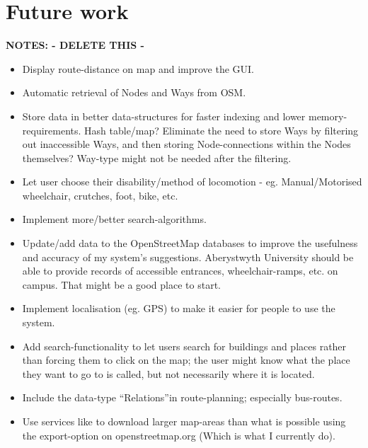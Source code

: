 \section{Future work}
\textbf{NOTES: - DELETE THIS -}
\begin{itemize}
	\item Display route-distance on map and improve the GUI.
	\item Automatic retrieval of Nodes and Ways from OSM.%
	\item Store data in better data-structures for faster indexing and lower memory-requirements.
	\subitem Hash table/map?
	\subitem Eliminate the need to store Ways by filtering out inaccessible Ways, and then storing Node-connections within the Nodes themselves? Way-type might not be needed after the filtering.
	\item Let user choose their disability/method of locomotion - eg. Manual/Motorised wheelchair, crutches, foot, bike, etc.
	\item Implement more/better search-algorithms.
	\item Update/add data to the OpenStreetMap databases to improve the usefulness and accuracy of my system's suggestions.
	\subitem Aberystwyth University should be able to provide records of accessible entrances, wheelchair-ramps, etc. on campus. That might be a good place to start.
	\item Implement localisation (eg. GPS) to make it easier for people to use the system.
	\item Add search-functionality to let users search for buildings and places rather than forcing them to click on the map; the user might know what the place they want to go to is called, but not necessarily where it is located.
	\item Include the data-type \textquotedblleft Relations\textquotedblright in route-planning; especially bus-routes.
	\item Use services like \cite{geofabrik,osrm} to download larger map-areas than what is possible using the export-option on openstreetmap.org (Which is what I currently do).
\end{itemize}